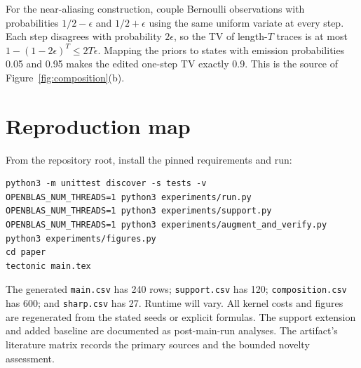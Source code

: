 \documentclass[11pt,letterpaper]{article}
\begin{document}
For the near-aliasing construction, couple Bernoulli observations with probabilities $1/2-\epsilon$ and $1/2+\epsilon$ using the same uniform variate at every step. Each step disagrees with probability $2\epsilon$, so the TV of length-$T$ traces is at most $1-(1-2\epsilon)^T\le2T\epsilon$. Mapping the priors to states with emission probabilities 0.05 and 0.95 makes the edited one-step TV exactly 0.9. This is the source of Figure~\ref{fig:composition}(b).

\section{Reproduction map}
From the repository root, install the pinned requirements and run:
\begin{verbatim}
python3 -m unittest discover -s tests -v
OPENBLAS_NUM_THREADS=1 python3 experiments/run.py
OPENBLAS_NUM_THREADS=1 python3 experiments/support.py
OPENBLAS_NUM_THREADS=1 python3 experiments/augment_and_verify.py
python3 experiments/figures.py
cd paper
tectonic main.tex
\end{verbatim}
The generated \texttt{main.csv} has 240 rows; \texttt{support.csv} has 120; \texttt{composition.csv} has 600; and \texttt{sharp.csv} has 27. Runtime will vary. All kernel costs and figures are regenerated from the stated seeds or explicit formulas. The support extension and added baseline are documented as post-main-run analyses. The artifact's literature matrix records the primary sources and the bounded novelty assessment.
\end{document}
